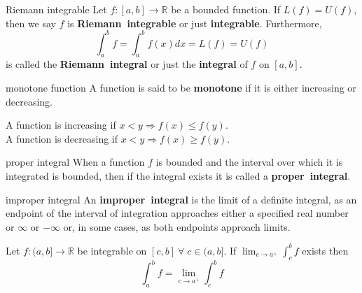 \documentclass[avery5371,grid]{flashcards}
\newcommand{\R}{\mathbb{R}}
\begin{document}
\begin{flashcard}[Definition]{Riemann integrable}
Let $f:[a,b] \rightarrow \R$ be a bounded function.  If $L(f)=U(f)$,
then we say $f$ is \mbox{\textbf{Riemann integrable}} or just 
\mbox{\textbf{integrable}}.  Furthermore,
\begin{equation*}
\int_a^b f = \int_a^b f(x) dx = L(f) = U(f)
\end{equation*}
is called the \mbox{\textbf{Riemann integral}} or just the
\mbox{\textbf{integral}} of $f$ on $[a,b]$.
\end{flashcard}


\begin{flashcard}[Definition]{monotone function}
A function is said to be \mbox{\textbf{monotone}} if it is either
increasing or decreasing.

\medskip
A function is increasing if $x<y \Rightarrow f(x) \leq f(y)$. \\
A function is decreasing if $x<y \Rightarrow f(x) \geq f(y)$.
\end{flashcard}

\begin{flashcard}[Definition]{proper integral}
When a function $f$ is bounded and the interval over which it is
integrated is bounded, then if the integral exists it is called a
\mbox{\textbf{proper integral}}.
\end{flashcard}

\begin{flashcard}[Definition]{improper integral}
An \mbox{\textbf{improper integral}} is the limit of a definite
integral, as an endpoint of the interval of integration approaches
either a specified real number or $\infty$ or $-\infty$ or, in some
cases, as both endpoints approach limits.

\medskip
Let $f:(a,b] \rightarrow \R$ be integrable on
$[c,b] \ \forall \; c \in (a,b]$.
If $\lim_{c \rightarrow a^{+}} \int_c^b f$ exists then
\begin{equation*}
\int_a^b f = \lim_{c \rightarrow a^{+}} \int_c^b f
\end{equation*}
\end{flashcard}
\end{document}

